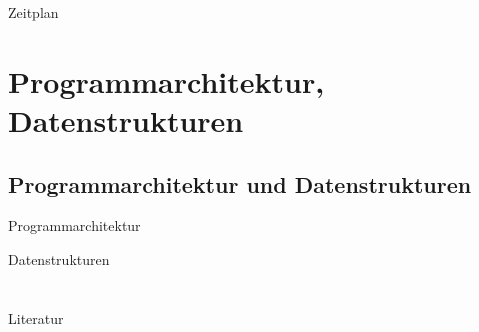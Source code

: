 \documentclass{beamer}
\begin{document}
\begin{frame}{Zeitplan}
\end{frame}



\section{Programmarchitektur, Datenstrukturen}
\subsection[Programmarchitektur]{ Programmarchitektur und Datenstrukturen }

\begin{frame}{Programmarchitektur}
\end{frame}

\begin{frame}{Datenstrukturen}
\end{frame}

\section{}
\subsection[]{}



\begin{frame}{Literatur}
\end{frame}
\end{document}
